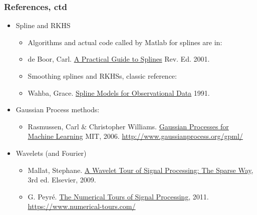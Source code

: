 \documentclass[bigger]{beamer}
\begin{document}
\begin{frame}
\frametitle{References, ctd}
\begin{itemize}
\item Spline and RKHS
\begin{itemize}
\item Algorithms and actual code called by Matlab for splines are in:
\item de Boor, Carl. \underline{A Practical Guide to Splines} Rev. Ed. 2001. 
\item Smoothing splines and RKHSs, classic reference:
\item Wahba, Grace. \underline{Spline Models for Observational Data}  1991.
\end{itemize}
\item Gaussian Process methods:
\begin{itemize}
\item Rasmussen, Carl $\&$ Christopher Williams. \underline{Gaussian Processes for Machine Learning} MIT, 2006. \url{http://www.gaussianprocess.org/gpml/}
\end{itemize}
\item Wavelets (and Fourier)
\begin{itemize}
\item Mallat, Stephane. \underline{A Wavelet Tour of Signal Processing: } \underline{The Sparse Way}, 3rd ed. Elsevier, 2009.
\item G. Peyr\'e. \underline{The Numerical Tours of Signal Processing}, 2011. \url{https://www.numerical-tours.com/}
\end{itemize}

\end{itemize}
\end{frame}

\end{document}
